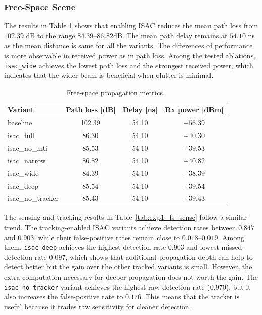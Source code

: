 \subsubsection{Free-Space Scene}
\label{subsubsec:controlled_validation_free_space}

The results in Table \ref{tab:exp1_fs_prop} shows that enabling ISAC reduces the mean path loss from $102.39$ dB to the range $84.39$--$86.82$dB.
The mean path delay remains at $54.10$ ns as the mean distance is same for all the variants.
The differences of performance is more observable in received power as in path loss.
Among the tested ablations, \texttt{isac\_wide} achieves the lowest path loss and the strongest received power, which indicates that the wider beam is beneficial when clutter is minimal.

\begin{table}[t]
    \centering
    \caption{Free-space propagation metrics.}
    \label{tab:exp1_fs_prop}
    \footnotesize
    \begin{tabular}{lccc}
        \hline
        Variant           & Path loss [dB] & Delay [ns] & Rx power [dBm] \\
        \hline
        baseline          & 102.39         & 54.10      & $-56.39$       \\
        isac\_full        & 86.30          & 54.10      & $-40.30$       \\
        isac\_no\_mti     & 85.53          & 54.10      & $-39.53$       \\
        isac\_narrow      & 86.82          & 54.10      & $-40.82$       \\
        isac\_wide        & 84.39          & 54.10      & $-38.39$       \\
        isac\_deep        & 85.54          & 54.10      & $-39.54$       \\
        isac\_no\_tracker & 85.43          & 54.10      & $-39.43$       \\
        \hline
    \end{tabular}
\end{table}

The sensing and tracking results in Table~\ref{tab:exp1_fs_sense} follow a similar trend.
The tracking-enabled ISAC variants achieve detection rates between $0.847$ and $0.903$, while their false-positive rates remain close to $0.018$--$0.019$.
Among them, \texttt{isac\_deep} achieves the highest detection rate $0.903$ and lowest missed-detection rate $0.097$, which shows that additional propagation depth can help to detect better but the gain over the other tracked variants is small.
However, the extra computation necessary for deeper propagation does not worth the gain.
The \texttt{isac\_no\_tracker} variant achieves the highest raw detection rate ($0.970$), but it also increases the false-positive rate to $0.176$.
This means that the tracker is useful because it trades raw sensitivity for cleaner detection.

